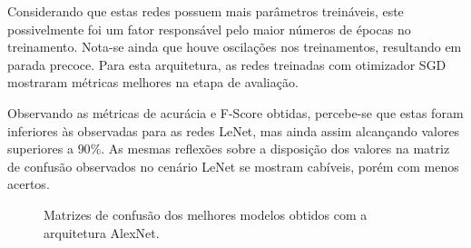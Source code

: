 Considerando que estas redes possuem mais parâmetros treináveis, este possivelmente foi um fator responsável pelo maior números de épocas no treinamento. Nota-se ainda que houve oscilações nos treinamentos, resultando em parada precoce. Para esta arquitetura, as redes treinadas com otimizador SGD mostraram métricas melhores na etapa de avaliação.

Observando as métricas de acurácia e F-Score obtidas, percebe-se que estas foram inferiores às observadas para as redes LeNet, mas ainda assim alcançando valores superiores a $90\%$. As mesmas reflexões sobre a disposição dos valores na matriz de confusão observados no cenário LeNet se mostram cabíveis, porém com menos acertos.

\begin{figure}[H]
 \centering
 \caption{Matrizes de confusão dos melhores modelos obtidos com a arquitetura AlexNet.}
 \hfill
 \label{fig:matrizes-alexnet}
\end{figure}

